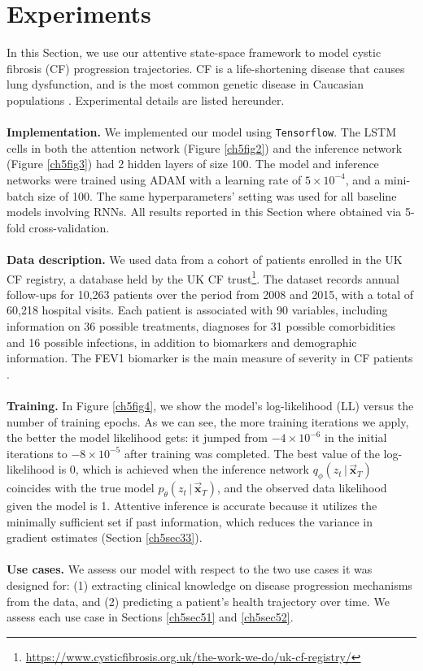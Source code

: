 \documentclass [PhD] {uclathes}
\begin{document}
\section{Experiments}
\label{ch5sec5}
In this Section, we use our attentive state-space framework to model cystic fibrosis (CF) progression trajectories. CF is a life-shortening disease that causes lung dysfunction, and is the most common genetic disease in Caucasian populations \cite{szczesniak2017phenotypes}. Experimental details are listed hereunder.\\ 
\\
{\bf Implementation.}\,\,We implemented our model using \texttt{Tensorflow}. The LSTM cells in both the attention network (Figure \ref{ch5fig2}) and the inference network (Figure \ref{ch5fig3}) had 2 hidden layers of size 100. The model and inference networks were trained using ADAM with a learning rate of $5 \times 10^{-4}$, and a mini-batch size of 100. The same hyperparameters' setting was used for all baseline models involving RNNs. All results reported in this Section where obtained via 5-fold cross-validation.\\
\\
{\bf Data description.}\,\,We used data from a cohort of patients enrolled in the UK CF registry, a database held by the UK CF trust\footnote{\url{https://www.cysticfibrosis.org.uk/the-work-we-do/uk-cf-registry/}}. The dataset records annual follow-ups for 10,263 patients over the period from 2008 and 2015, with a total of 60,218 hospital visits. Each patient is associated with 90 variables, including information on 36 possible treatments, diagnoses for 31 possible comorbidities and 16 possible infections, in addition to biomarkers and demographic information. The FEV1 biomarker is the main measure of severity in CF patients \cite{sanders2010return}.\\
\\
{\bf Training.}\,\,In Figure \ref{ch5fig4}, we show the model's log-likelihood (LL) versus the number of training epochs. As we can see, the more training iterations we apply, the better the model likelihood gets: it jumped from $-4 \times 10^{-6}$ in the initial iterations to $-8 \times 10^{-5}$ after training was completed. The best value of the log-likelihood is 0, which is achieved when the inference network $q_{\phi}(z_t\,|\,\boldsymbol{\vec{x}}_T)$ coincides with the true model $p_{\theta}(z_t\,|\,\boldsymbol{\vec{x}}_T)$, and the observed data likelihood given the model is 1. Attentive inference is accurate because it utilizes the minimally sufficient set if past information, which reduces the variance in gradient estimates (Section \ref{ch5sec33}).\\
\\
{\bf Use cases.}\,\,We assess our model with respect to the two use cases it was designed for: (1) extracting clinical knowledge on disease progression mechanisms from the data, and (2) predicting a patient's health trajectory over time. We assess each use case in Sections \ref{ch5sec51} and \ref{ch5sec52}.  
\end{document}
